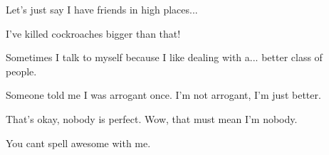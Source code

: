 \documentclass[letterpaper,10pt,twoside,twocolumn,openany]{book}
\begin{document}
\begin{description}
	\item[] Let's just say I have friends in high places...
	\item[] I've killed cockroaches bigger than that!
	\item[] Sometimes I talk to myself because I like dealing with a... better class of people.
	\item[] Someone told me I was arrogant once. I'm not arrogant, I'm just better.
	\item[] That's okay, nobody is perfect. Wow, that must mean I'm nobody.
	\item[] You cant spell awesome with me.
\end{description}


\end{document}
